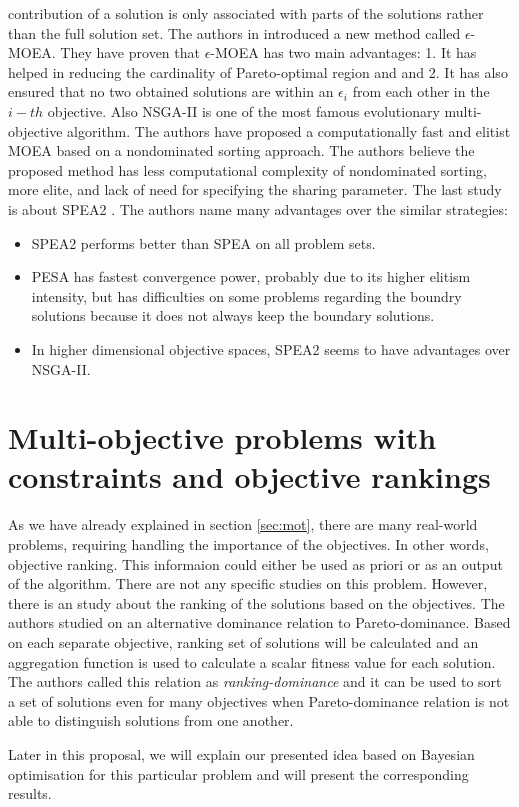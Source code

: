 contribution of a solution is only associated with parts of the solutions rather than the full solution set.
The authors in \cite{jiang2015simple} introduced a new method called $\epsilon$-MOEA. They have proven that $\epsilon$-MOEA has two main advantages: 1. It has helped in reducing the cardinality of Pareto-optimal region and and 2. It has also ensured that no two obtained solutions are within an $\epsilon_i$ from each other in the $i-th$ objective.
Also NSGA-II \cite{deb2002fast} is one of the most famous evolutionary multi-objective algorithm. The authors have proposed a computationally fast and elitist MOEA based on a nondominated sorting approach. The authors believe the proposed method has less computational complexity of nondominated sorting, more elite, and lack of need for specifying the sharing parameter.
The last study is about SPEA2 \cite{zitzler2001spea2}. The authors name many advantages over the similar strategies:
\begin{itemize}
\item SPEA2 performs better than SPEA on all problem sets.
\item PESA has fastest convergence power, probably due to its higher elitism intensity, but has difficulties on some problems regarding the boundry solutions because it does not always keep the boundary solutions.
\item In higher dimensional objective spaces, SPEA2 seems to have advantages over NSGA-II.
\end{itemize}

\section{Multi-objective problems with constraints and objective rankings}
As we have already explained in section \ref{sec:mot}, there are many real-world problems, requiring handling the importance of the objectives. In other words, objective ranking. This informaion could either be used as priori or as an output of the algorithm. There are not any specific studies on this problem. However, there is an study \cite{kukkonen2007ranking} about the ranking of the solutions based on the objectives. 
The authors studied on an alternative dominance relation to Pareto-dominance. Based on each separate objective, ranking set of solutions will be calculated and an aggregation function is used to calculate a scalar fitness value for each solution. The authors called this relation as \textit{ranking-dominance} and it can be used to sort a set of solutions even for many objectives when Pareto-dominance relation is not able to distinguish solutions from one another. 
\par
Later in this proposal, we will explain our presented idea based on Bayesian optimisation for this particular problem and will present the corresponding results.